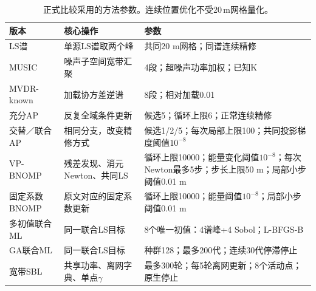 \begin{table}[pos=H]\centering\footnotesize
\caption{正式比较采用的方法参数。连续位置优化不受20\,m网格量化。}\label{tab:parameters}
\begin{tabularx}{\linewidth}{@{}p{.18\linewidth}p{.27\linewidth}X@{}}\toprule
版本 & 核心操作 & 参数\\\midrule
LS谱 & 单源LS谱取两个峰 & 共同20 m网格；同谱连续精修\\
MUSIC & 噪声子空间宽带汇聚 & 4段；超噪声功率加权；已知K\\
MVDR-known & 加载协方差逆谱 & 8段；相对加载0.01\\
充分AP & 反复全域条件更新 & 候选5；循环上限6；正常连续精修\\
交替／联合AP & 相同分支，改变精修方式 & 候选1/2/5；每次局部上限100；共同投影梯度阈值$10^{-8}$\\
VP-BNOMP & 残差发现、消元Newton、共同LS & 循环上限10000；能量变化阈值$10^{-8}$；每次Newton最多5步；步长上限50 m；局部小步阈值0.01 m\\
固定系数BNOMP & 原文对应的固定系数更新 & 循环上限10000；能量阈值$10^{-8}$；局部小步阈值0.01 m\\
多初值联合ML & 同一联合LS目标 & 8个唯一初值：4谱峰+4 Sobol；L-BFGS-B\\
GA联合ML & 同一联合LS目标 & 种群128；最多200代；连续30代停滞停止\\
宽带SBL & 共享功率、离网字典、单点$\gamma$ & 最多300轮；每5轮离网更新；8个活动点；原生停止\\
\bottomrule\end{tabularx}\end{table}
